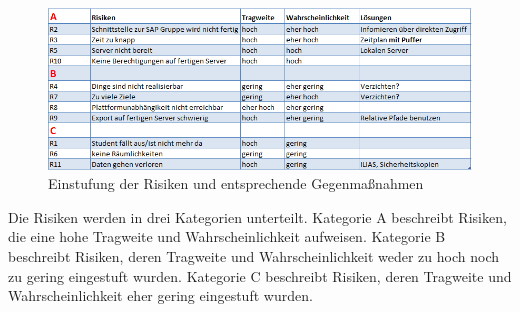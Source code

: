 \begin{figure}[H] 
  \centering
     \includegraphics[width=15cm]{Bilder/Risikoanalyse1.png}
  \caption{Einstufung der Risiken und entsprechende Gegenmaßnahmen}
  \label{fig:Abbildung 2}
\end{figure}

Die Risiken werden in drei Kategorien unterteilt. Kategorie A beschreibt Risiken, die eine hohe Tragweite und Wahrscheinlichkeit aufweisen. Kategorie B beschreibt Risiken, deren Tragweite und Wahrscheinlichkeit weder zu hoch noch zu gering eingestuft wurden. Kategorie C beschreibt Risiken, deren Tragweite und Wahrscheinlichkeit eher gering eingestuft wurden.

